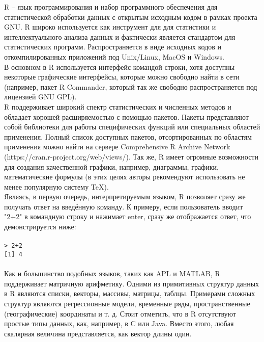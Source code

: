 R – язык программирования и набор программного обеспечения для статистической обработки 
данных с открытым исходным кодом в рамках проекта GNU. R широко используется как 
инструмент для для статистики и интеллектуального анализа данных и фактически является стандартом
для статистических программ. Распространяется в виде исходных кодов и откомпилированных
приложений под Unix/Linux, MacOS и Windows. \\
\indent В основном в R используется интерфейс командой строки, хотя доступны некоторые графические
интерфейсы, которые можно свободно найти в сети (например, пакет R Commander, который так
же свободно распространяется под лицензией GNU GPL). \\ 
\indent R поддерживает широкий спектр статистических и численных методов и обладает хорошей расширяемостью 
с помощью пакетов. Пакеты представляют собой библиотеки для работы специфических функций или 
специальных областей применения. Полный список доступных пакетов, отсортированных по областям 
применения можно найти на сервере Comprehensive R Archive Network (https://cran.r-project.org/web/views/). Так же, R имеет огромные 
возможности для создания качественной графики, например, диаграммы, графики, математические формулы 
(в этих целях авторы рекомендуют использовать не менее популярную систему TeX). \\
\indent Являясь, в первую очередь, интерпретируемым языком, R позволяет сразу же получать ответ на введённую
команду. К примеру, если пользователь вводит "2+2" в командную строку и нажимает enter, сразу же
отображается ответ, что демонстрируется ниже: \\ \\
\indent \texttt{> 2+2} \\ 
\indent \texttt{[1] 4} \\ \\
\indent Как и большинство подобных языков, таких как APL и MATLAB, R поддерживает матричную арифметику.
Одними из примитивных структур данных в R являются списки, векторы, массивы, матрицы, таблцы.
Примерами сложных структур являются регрессионные модели, временные ряды, пространственные 
(географические) координаты и т. д. Стоит отметить, что в R отсутствуют простые типы данных, как,
например, в C или Java. Вместо этого, любая скалярная величина представляется, как вектор длины один.

